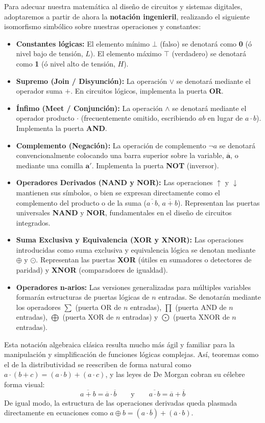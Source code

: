 \documentclass[12pt,a4paper]{article}
\begin{document}
Para adecuar nuestra matemática al diseño de circuitos y sistemas digitales, adoptaremos a partir de ahora la \textbf{notación ingenieril}, realizando el siguiente isomorfismo simbólico sobre nuestras operaciones y constantes:
\begin{itemize}
    \item \textbf{Constantes lógicas:} El elemento mínimo $\bot$ (falso) se denotará como \textbf{0} (ó nivel bajo de tensión, $L$). El elemento máximo $\top$ (verdadero) se denotará como \textbf{1} (ó nivel alto de tensión, $H$).
    \item \textbf{Supremo (Join / Disyunción):} La operación $\vee$ se denotará mediante el operador suma $\mathbf{+}$. En circuitos lógicos, implementa la puerta \textbf{OR}.
    \item \textbf{Ínfimo (Meet / Conjunción):} La operación $\wedge$ se denotará mediante el operador producto $\mathbf{\cdot}$ (frecuentemente omitido, escribiendo $ab$ en lugar de $a \cdot b$). Implementa la puerta \textbf{AND}.
    \item \textbf{Complemento (Negación):} La operación de complemento $\neg a$ se denotará convencionalmente colocando una barra superior sobre la variable, $\mathbf{\overline{a}}$, o mediante una comilla $\mathbf{a'}$. Implementa la puerta \textbf{NOT} (inversor).
    \item \textbf{Operadores Derivados (NAND y NOR):} Las operaciones $\uparrow$ y $\downarrow$ mantienen sus símbolos, o bien se expresan directamente como el complemento del producto o de la suma ($\overline{a \cdot b}$, $\overline{a+b}$). Representan las puertas universales \textbf{NAND} y \textbf{NOR}, fundamentales en el diseño de circuitos integrados.
    \item \textbf{Suma Exclusiva y Equivalencia (XOR y XNOR):} Las operaciones introducidas como suma exclusiva y equivalencia lógica se denotan mediante $\mathbf{\oplus}$ y $\mathbf{\odot}$. Representan las puertas \textbf{XOR} (útiles en sumadores o detectores de paridad) y \textbf{XNOR} (comparadores de igualdad).
    \item \textbf{Operadores n-arios:} Las versiones generalizadas para múltiples variables formarán estructuras de puertas lógicas de $n$ entradas. Se denotarán mediante los operadores $\sum$ (puerta OR de $n$ entradas), $\prod$ (puerta AND de $n$ entradas), $\bigoplus$ (puerta XOR de $n$ entradas) y $\bigodot$ (puerta XNOR de $n$ entradas).
\end{itemize}

Esta notación algebraica clásica resulta mucho más ágil y familiar para la manipulación y simplificación de funciones lógicas complejas. Así, teoremas como el de la distributividad se reescriben de forma natural como $a \cdot (b + c) = (a \cdot b) + (a \cdot c)$, y las leyes de De Morgan cobran su célebre forma visual:
\[ \overline{a + b} = \overline{a} \cdot \overline{b} \qquad \text{y} \qquad \overline{a \cdot b} = \overline{a} + \overline{b} \]
De igual modo, la estructura de las operaciones derivadas queda plasmada directamente en ecuaciones como $a \oplus b = (a \cdot \overline{b}) + (\overline{a} \cdot b)$.
\end{document}
